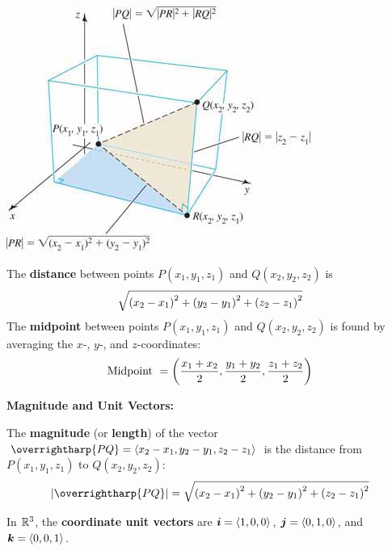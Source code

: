 \documentclass[../mathNotesPreamble]{subfiles}
\begin{document}
    \begin{center}
      \includegraphics[width=0.5\linewidth]{../images/briggs_13_02/fig13_32}
    \end{center}
    \begin{thmBox*}

      The \textbf{distance} between points $P(x_1,y_1,z_1)$ and $Q(x_2,y_2,z_2)$ is
        \[\sqrt{{\left(x_2-x_1\right)}^2+{\left(y_2-y_1\right)}^2+{\left(z_2-z_1\right)}^2}\]
      The \textbf{midpoint} between points $P(x_1,y_1,z_1)$ and $Q(x_2,y_2,z_2)$ is found by averaging the $x$-, $y$-, and $z$-coordinates:
        \[\textnormal{Midpoint }={\left(\frac{x_1+x_2}{2},\frac{y_1+y_2}{2},\frac{z_1+z_2}{2}\right)}\]
    \end{thmBox*}
    \pagebreak

    \textbf{Magnitude and Unit Vectors:}
  \begin{defn*}
    The \textbf{magnitude} (or \textbf{length}) of the vector $\overrightharp{PQ}=\bracket{x_2-x_1,y_2-y_1,z_2-z_1}$ is the distance from $P(x_1,y_1,z_1)$ to $Q(x_2,y_2,z_2)$:
      \[\abs{\overrightharp{PQ}}=\sqrt{\parens{x_2-x_1}^2+\parens{y_2-y_1}^2+\parens{z_2-z_1}^2}\]
  \end{defn*}
  \noindent
  In $\mathbb{R}^3$, the \textbf{coordinate unit vectors} are ${\bm{i}}={\left\langle 1,0,0 \right\rangle}$, ${\bm{j}}={\left\langle 0,1,0 \right\rangle}$, and ${\bm{k}}={\left\langle 0,0,1 \right\rangle}$.
\end{document}
